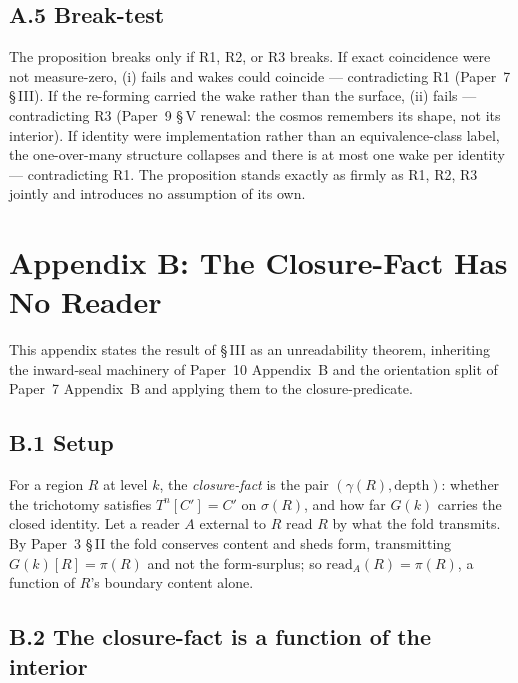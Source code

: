 \documentclass[11pt,oneside]{report}
\theoremstyle{definition}
\theoremstyle{remark}
\begin{document}
\subsection*{A.5 Break-test}

The proposition breaks only if R1, R2, or R3 breaks. If exact coincidence were not measure-zero, (i) fails and wakes could coincide --- contradicting R1 (Paper~7 \S\,III). If the re-forming carried the wake rather than the surface, (ii) fails --- contradicting R3 (Paper~9 \S\,V renewal: the cosmos remembers its shape, not its interior). If identity were implementation rather than an equivalence-class label, the one-over-many structure collapses and there is at most one wake per identity --- contradicting R1. The proposition stands exactly as firmly as R1, R2, R3 jointly and introduces no assumption of its own.

\section*{Appendix B: The Closure-Fact Has No Reader}

This appendix states the result of \S\,III as an unreadability theorem, inheriting the inward-seal machinery of Paper~10 Appendix~B and the orientation split of Paper~7 Appendix~B and applying them to the closure-predicate.

\subsection*{B.1 Setup}

For a region \ensuremath{R} at level \ensuremath{k}, the \emph{closure-fact} is the pair \ensuremath{(\gamma(R), \text{depth})}: whether the trichotomy satisfies \ensuremath{T^{n}[C'] = C'} on \ensuremath{\sigma(R)}, and how far \ensuremath{G(k)} carries the closed identity. Let a reader \ensuremath{A} external to \ensuremath{R} read \ensuremath{R} by what the fold transmits. By Paper~3 \S\,II the fold conserves content and sheds form, transmitting \ensuremath{G(k)[R] = \pi(R)} and not the form-surplus; so \ensuremath{\mathrm{read}_A(R) = \pi(R)}, a function of \ensuremath{R}'s boundary content alone.

\subsection*{B.2 The closure-fact is a function of the interior}
\end{document}
